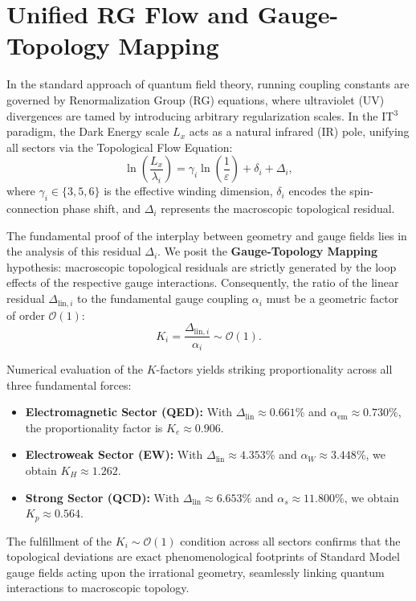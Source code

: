 \documentclass[aps,prd,twocolumn,groupedaddress,superscriptaddress,amsmath,amssymb]{revtex4-2}
\begin{document}
\section{Unified RG Flow and Gauge-Topology Mapping}
\label{sec:rg_flow}
In the standard approach of quantum field theory, running coupling constants are governed by Renormalization Group (RG) equations, where ultraviolet (UV) divergences are tamed by introducing arbitrary regularization scales. In the IT$^3$ paradigm, the Dark Energy scale $L_x$ acts as a natural infrared (IR) pole, unifying all sectors via the Topological Flow Equation:
\begin{equation}
    \label{eq:unified_flow}
    \ln\left(\frac{L_x}{\lambda_i}\right) = \gamma_i \ln\left(\frac{1}{\varepsilon}\right) + \delta_i + \Delta_i,
\end{equation}
where $\gamma_i \in \{3,5,6\}$ is the effective winding dimension, $\delta_i$ encodes the spin-connection phase shift, and $\Delta_i$ represents the macroscopic topological residual.

The fundamental proof of the interplay between geometry and gauge fields lies in the analysis of this residual $\Delta_i$. We posit the \textbf{Gauge-Topology Mapping} hypothesis: macroscopic topological residuals are strictly generated by the loop effects of the respective gauge interactions. Consequently, the ratio of the linear residual $\Delta_{\text{lin}, i}$ to the fundamental gauge coupling $\alpha_i$ must be a geometric factor of order $\mathcal{O}(1)$:
\begin{equation}
    K_i = \frac{\Delta_{\text{lin}, i}}{\alpha_i} \sim \mathcal{O}(1).
\end{equation}

Numerical evaluation of the $K$-factors yields striking proportionality across all three fundamental forces:
\begin{itemize}
    \item \textbf{Electromagnetic Sector (QED):} With $\Delta_{\text{lin}} \approx 0.661\%$ and $\alpha_{\text{em}} \approx 0.730\%$, the proportionality factor is $K_e \approx 0.906$.
    \item \textbf{Electroweak Sector (EW):} With $\Delta_{\text{lin}} \approx 4.353\%$ and $\alpha_W \approx 3.448\%$, we obtain $K_H \approx 1.262$.
    \item \textbf{Strong Sector (QCD):} With $\Delta_{\text{lin}} \approx 6.653\%$ and $\alpha_s \approx 11.800\%$, we obtain $K_p \approx 0.564$.
\end{itemize}
The fulfillment of the $K_i \sim \mathcal{O}(1)$ condition across all sectors confirms that the topological deviations are exact phenomenological footprints of Standard Model gauge fields acting upon the irrational geometry, seamlessly linking quantum interactions to macroscopic topology.
\end{document}
